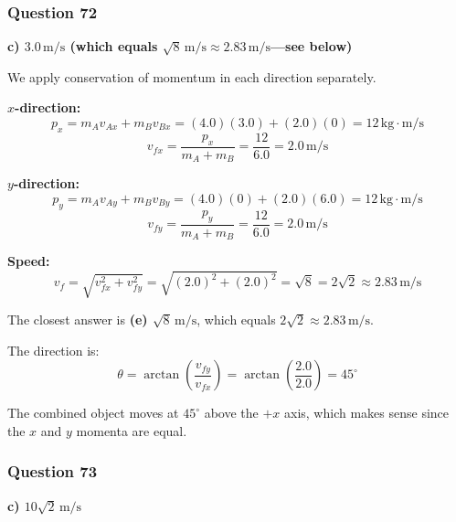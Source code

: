\documentclass[12pt,letterpaper]{article}
\begin{document}
\subsubsection*{Question 72}

\begin{answerbox}
\textbf{c) $3.0\,\text{m/s}$ (which equals $\sqrt{8}\,\text{m/s} \approx 2.83\,\text{m/s}$---see below)}
\end{answerbox}

\begin{explanationbox}
We apply conservation of momentum in each direction separately.

\textbf{$x$-direction:}
\[
p_{x} = m_A v_{Ax} + m_B v_{Bx} = (4.0)(3.0) + (2.0)(0) = 12\,\text{kg}\cdot\text{m/s}
\]
\[
v_{fx} = \frac{p_x}{m_A + m_B} = \frac{12}{6.0} = 2.0\,\text{m/s}
\]

\textbf{$y$-direction:}
\[
p_{y} = m_A v_{Ay} + m_B v_{By} = (4.0)(0) + (2.0)(6.0) = 12\,\text{kg}\cdot\text{m/s}
\]
\[
v_{fy} = \frac{p_y}{m_A + m_B} = \frac{12}{6.0} = 2.0\,\text{m/s}
\]

\textbf{Speed:}
\[
v_f = \sqrt{v_{fx}^2 + v_{fy}^2} = \sqrt{(2.0)^2 + (2.0)^2} = \sqrt{8} = 2\sqrt{2} \approx 2.83\,\text{m/s}
\]

The closest answer is \textbf{(e) $\sqrt{8}\,\text{m/s}$}, which equals $2\sqrt{2} \approx 2.83\,\text{m/s}$.

The direction is:
\[
\theta = \arctan\left(\frac{v_{fy}}{v_{fx}}\right) = \arctan\left(\frac{2.0}{2.0}\right) = 45^\circ
\]

The combined object moves at $45^\circ$ above the $+x$ axis, which makes sense since the $x$ and $y$ momenta are equal.
\end{explanationbox}

\subsubsection*{Question 73}

\begin{answerbox}
\textbf{c) $10\sqrt{2}\,\text{m/s}$}
\end{answerbox}
\end{document}

